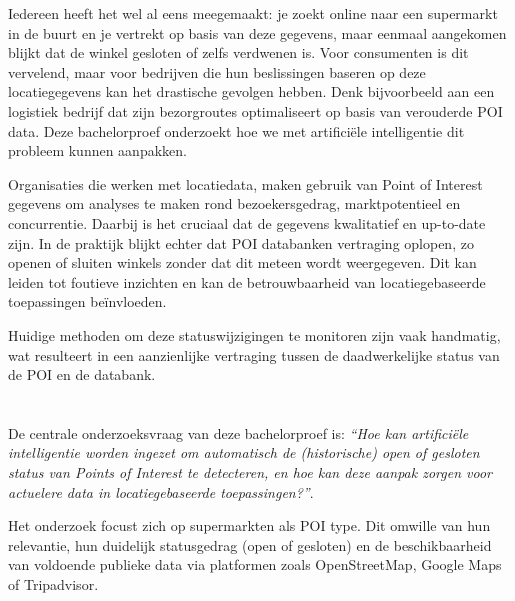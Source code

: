 Iedereen heeft het wel al eens meegemaakt: je zoekt online naar een supermarkt in de buurt en je vertrekt op basis van deze gegevens, maar eenmaal aangekomen blijkt dat de winkel gesloten of zelfs verdwenen is. Voor consumenten is dit vervelend, maar voor bedrijven die hun beslissingen baseren op deze locatiegegevens kan het drastische gevolgen hebben. Denk bijvoorbeeld aan een logistiek bedrijf dat zijn bezorgroutes optimaliseert op basis van verouderde POI data. Deze bachelorproef onderzoekt hoe we met artificiële intelligentie dit probleem kunnen aanpakken.

Organisaties die werken met locatiedata, maken gebruik van Point of Interest gegevens om analyses te maken rond bezoekersgedrag, marktpotentieel en concurrentie. Daarbij is het cruciaal dat de gegevens kwalitatief en up-to-date zijn. In de praktijk blijkt echter dat POI databanken vertraging oplopen, zo openen of sluiten winkels zonder dat dit meteen wordt weergegeven. Dit kan leiden tot foutieve inzichten en kan de betrouwbaarheid van locatiegebaseerde toepassingen beïnvloeden.

Huidige methoden om deze statuswijzigingen te monitoren zijn vaak handmatig, wat resulteert in een aanzienlijke vertraging tussen de daadwerkelijke status van de POI en de databank.

\section{}%
\label{sec:onderzoeksvraag}


De centrale onderzoeksvraag van deze bachelorproef is: \textit{“Hoe kan artificiële intelligentie worden ingezet om automatisch de (historische) open of gesloten status van Points of Interest te detecteren, en hoe kan deze aanpak zorgen voor actuelere data in locatiegebaseerde toepassingen?”}.

Het onderzoek focust zich op supermarkten als POI type. Dit omwille van hun relevantie, hun duidelijk statusgedrag (open of gesloten) en de beschikbaarheid van voldoende publieke data via platformen zoals OpenStreetMap, Google Maps of Tripadvisor. 

